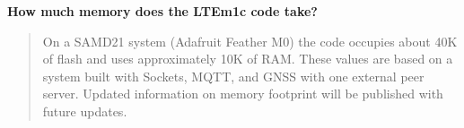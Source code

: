 {\bfseries{How much memory does the L\+T\+Em1c code take?}} \begin{quote}
On a S\+A\+M\+D21 system (Adafruit Feather M0) the code occupies about 40K of flash and uses approximately 10K of R\+AM. These values are based on a system built with Sockets, M\+Q\+TT, and G\+N\+SS with one external peer server. Updated information on memory footprint will be published with future updates. \end{quote}

